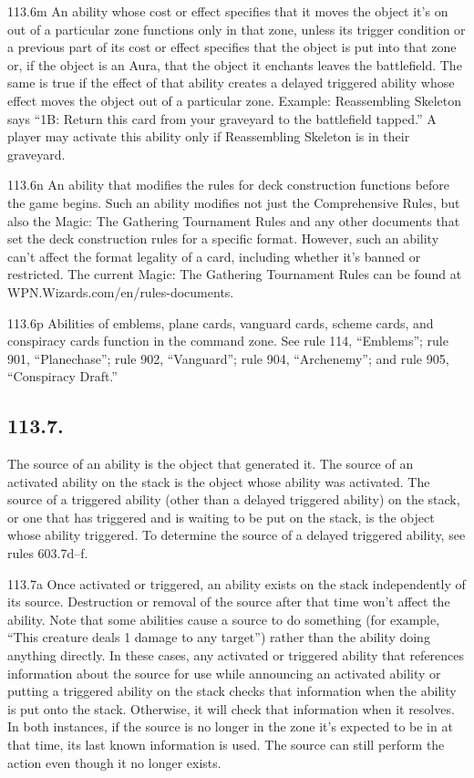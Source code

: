 113.6m An ability whose cost or effect specifies that it moves the object it’s on out of a particular zone functions only in that zone, unless its trigger condition or a previous part of its cost or effect specifies that the object is put into that zone or, if the object is an Aura, that the object it enchants leaves the battlefield. The same is true if the effect of that ability creates a delayed triggered ability whose effect moves the object out of a particular zone.
Example: Reassembling Skeleton says “{1}{B}: Return this card from your graveyard to the battlefield tapped.” A player may activate this ability only if Reassembling Skeleton is in their graveyard.

113.6n An ability that modifies the rules for deck construction functions before the game begins. Such an ability modifies not just the Comprehensive Rules, but also the Magic: The Gathering Tournament Rules and any other documents that set the deck construction rules for a specific format. However, such an ability can’t affect the format legality of a card, including whether it’s banned or restricted. The current Magic: The Gathering Tournament Rules can be found at WPN.Wizards.com/en/rules-documents.

113.6p Abilities of emblems, plane cards, vanguard cards, scheme cards, and conspiracy cards function in the command zone. See rule 114, “Emblems”; rule 901, “Planechase”; rule 902, “Vanguard”; rule 904, “Archenemy”; and rule 905, “Conspiracy Draft.”

\subsection*{113.7.}
The source of an ability is the object that generated it. The source of an activated ability on the stack is the object whose ability was activated. The source of a triggered ability (other than a delayed triggered ability) on the stack, or one that has triggered and is waiting to be put on the stack, is the object whose ability triggered. To determine the source of a delayed triggered ability, see rules 603.7d–f.

113.7a Once activated or triggered, an ability exists on the stack independently of its source. Destruction or removal of the source after that time won’t affect the ability. Note that some abilities cause a source to do something (for example, “This creature deals 1 damage to any target”) rather than the ability doing anything directly. In these cases, any activated or triggered ability that references information about the source for use while announcing an activated ability or putting a triggered ability on the stack checks that information when the ability is put onto the stack. Otherwise, it will check that information when it resolves. In both instances, if the source is no longer in the zone it’s expected to be in at that time, its last known information is used. The source can still perform the action even though it no longer exists.

